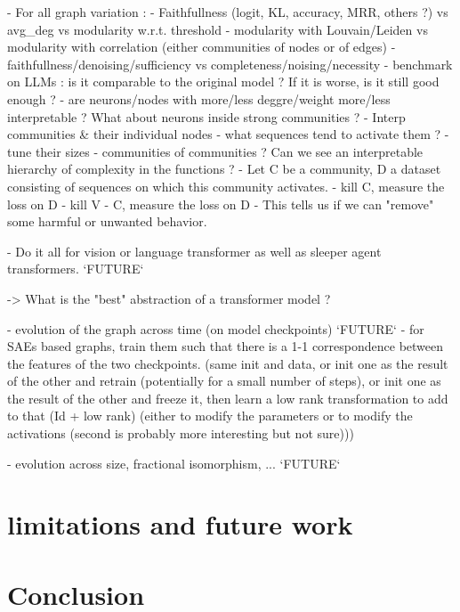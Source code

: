 \documentclass{article}
\begin{document}
- For all graph variation :
    - Faithfullness (logit, KL, accuracy, MRR, others ?) vs avg_deg vs modularity w.r.t. threshold
        - modularity with Louvain/Leiden vs modularity with correlation (either communities of nodes or of edges)
        - faithfullness/denoising/sufficiency vs completeness/noising/necessity
    - benchmark on LLMs : is it comparable to the original model ? If it is worse, is it still good enough ?
    - are neurons/nodes with more/less deggre/weight more/less interpretable ? What about neurons inside strong communities ?
    - Interp communities & their individual nodes
        - what sequences tend to activate them ?
        - tune their sizes
        - communities of communities ? Can we see an interpretable hierarchy of complexity in the functions ?
    - Let C be a community, D a dataset consisting of sequences on which this community activates.
        - kill C, measure the loss on D
        - kill V - C, measure the loss on D
        - This tells us if we can "remove" some harmful or unwanted behavior.

        
- Do it all for vision or language transformer as well as sleeper agent transformers. `FUTURE`

-> What is the "best" abstraction of a transformer model ?

- evolution of the graph across time (on model checkpoints) `FUTURE`
    - for SAEs based graphs, train them such that there is a 1-1 correspondence between the features of the two checkpoints. (same init and data, or init one as the result of the other and retrain (potentially for a small number of steps), or init one as the result of the other and freeze it, then learn a low rank transformation to add to that (Id + low rank) (either to modify the parameters or to modify the activations (second is probably more interesting but not sure)))

- evolution across size, fractional isomorphism, ... `FUTURE`

\section{limitations and future work}

\section{Conclusion}



\end{document}
